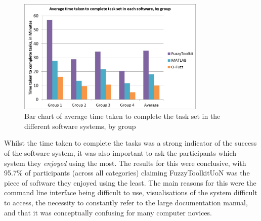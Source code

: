 \begin{figure}[ht!]
	\begin{center}
		\includegraphics[width=0.8\textwidth]{images/timeTaken}
	\end{center}
	\vspace{-5mm}
	\captionsetup{justification=centering,margin=2cm}
	\caption{Bar chart of average time taken to complete the task set in the different software systems, by group}
	\label{fig:times}
	\vspace{-10mm}
\end{figure}
\newpage 
\noindent 						
Whilst the time taken to complete the tasks was a strong indicator of the success of the software system, it was also important to ask the participants which system they \emph{enjoyed} using the most. The results for this were conclusive, with 95.7\% of participants (across all categories) claiming FuzzyToolkitUoN was the piece of software they enjoyed using the least. The main reasons for this were the command line interface being difficult to use, visualisations of the system difficult to access, the necessity to constantly refer to the large documentation manual, and that it was conceptually confusing for many computer novices. 

